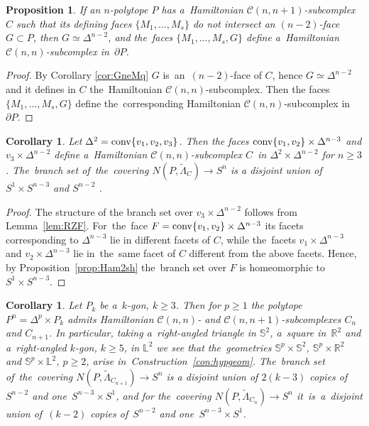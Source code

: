 \documentclass[12pt]{amsart}
\newtheorem{proposition}[formula]{Proposition}
\newtheorem{corollary}[formula]{Corollary}
\theoremstyle{definition}
\theoremstyle{remark}
\begin{document}
\begin{proposition}\label{prop:nn}
If an $n$-polytope $P$ has a~Hamiltonian $\mathcal{C}(n,n+1)$-subcomplex $C$ such
that its defining faces $\{M_1,\dots, M_s\}$ do not intersect an $(n-2)$-face $G\subset P$, then $G\simeq \Delta^{n-2}$,
and the~faces $\{M_1,\dots, M_s, G\}$ define  a~Hamiltonian $\mathcal{C}(n,n)$-subcomplex in~$\partial P$.
\end{proposition}
\begin{proof}
By Corollary \ref{cor:GneMq} $G$ is~an~$(n-2)$-face  of $C$, hence $G\simeq\Delta^{n-2}$ and 
it defines in $C$ the~Hamiltonian $\mathcal{C}(n,n)$-subcomplex. Then  the faces $\{M_1,\dots, M_s, G\}$ 
define  the~corresponding Hamiltonian $\mathcal{C}(n,n)$-subcomplex in~$\partial P$.
\end{proof}
\begin{corollary}\label{cor:pk}
Let $\Delta^2={\rm conv}\{v_1,v_2,v_3\}$. Then the faces ${\rm conv}\{v_1,v_2\}\times \Delta^{n-3}$ and 
$v_3\times\Delta^{n-2}$ define a~Hamiltonian
$\mathcal{C}(n,n)$-subcomplex $C$~in $\Delta^2\times \Delta^{n-2}$ for $n\geqslant 3$. The~branch set
of~the~covering $N(P,\widetilde{\Lambda}_C)\to S^n$ is a disjoint union of $S^1\times S^{n-3}$ and $S^{n-2}$ .
\end{corollary}
\begin{proof}
The structure of the branch set over $v_3\times\Delta^{n-2}$ follows from Lemma~\ref{lem:RZF}. 
For~the~face $F={\rm conv}\{v_1,v_2\}\times \Delta^{n-3}$ its facets corresponding to $\Delta^{n-3}$ 
lie in different facets of $C$, while the~facets $v_1\times \Delta^{n-3}$ and $v_2\times \Delta^{n-3}$
lie in~the~same facet of $C$ different from the above facets. Hence, by Proposition~\ref{prop:Ham2sh}
the~branch set over $F$ is homeomorphic to $S^1\times S^{n-3}$. 
\end{proof}
\begin{corollary}\label{cor:SxX2}
Let $P_k$ be a~$k$-gon, $k\geqslant 3$. Then for $p\geqslant 1$ the polytope $P^n=\Delta^p\times P_k$
admits Hamiltonian $\mathcal{C}(n,n)$- and $\mathcal{C}(n,n+1)$-subcomplexes $C_n$ and $C_{n+1}$. 
In particular, taking a~right-angled triangle in $\mathbb S^2$, a~square in~$\mathbb R^2$ and 
a~right-angled $k$-gon, $k\geqslant 5$, in $\mathbb L^2$ we see that the~geometries $\mathbb S^p\times \mathbb S^2$,
$\mathbb S^p\times \mathbb R^2$
and $\mathbb S^p\times \mathbb L^2$, $p\geqslant 2$, arise in~Construction~\ref{con:hypgeom}.
The~branch set of~the~covering $N(P,\widetilde{\Lambda}_{C_{n+1}})\to S^n$ 
is a disjoint union of $2(k-3)$ copies of $S^{n-2}$ and one~$S^{n-3}\times S^1$, and
for the~covering $N(P,\widetilde{\Lambda}_{C_n})\to S^n$ it~is~a~disjoint union of~$(k-2)$ copies of~$S^{n-2}$
and one~$S^{n-3}\times S^1$.
\end{corollary}
\end{document}
